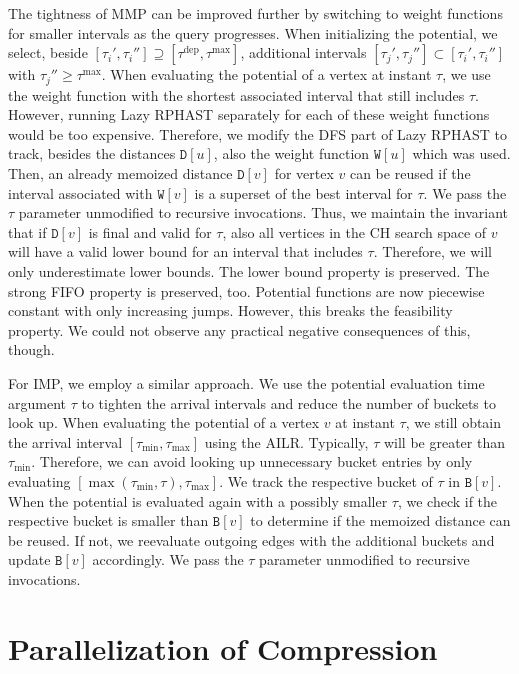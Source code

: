 \documentclass[a4paper,UKenglish,cleveref, autoref, thm-restate,anonymous]{lipics-v2021}
\newcommand*{\tdep}{\tau^{\operatorname{dep}}}
\newcommand*{\tmax}{\tau^{\max}}
\begin{document}
The tightness of MMP can be improved further by switching to weight functions for smaller intervals as the query progresses.
When initializing the potential, we select, beside $[\tau_i', \tau_i''] \supseteq [\tdep,\tmax]$, additional intervals $[\tau_j', \tau_j''] \subset [\tau_i', \tau_i'']$ with $\tau_j'' \geq \tmax$.
When evaluating the potential of a vertex at instant $\tau$, we use the weight function with the shortest associated interval that still includes $\tau$.
However, running Lazy RPHAST separately for each of these weight functions would be too expensive.
Therefore, we modify the DFS part of Lazy RPHAST to track, besides the distances $\mathtt{D}[u]$, also the weight function $\mathtt{W}[u]$ which was used.
Then, an already memoized distance $\mathtt{D}[v]$ for vertex $v$ can be reused if the interval associated with $\mathtt{W}[v]$ is a superset of the best interval for $\tau$.
We pass the $\tau$ parameter unmodified to recursive invocations.
Thus, we maintain the invariant that if $\mathtt{D}[v]$ is final and valid for $\tau$, also all vertices in the CH search space of $v$ will have a valid lower bound for an interval that includes $\tau$.
Therefore, we will only underestimate lower bounds.
The lower bound property is preserved.
The strong FIFO property is preserved, too.
Potential functions are now piecewise constant with only increasing jumps.
However, this breaks the feasibility property.
We could not observe any practical negative consequences of this, though.

For IMP, we employ a similar approach.
We use the potential evaluation time argument $\tau$ to tighten the arrival intervals and reduce the number of buckets to look up.
When evaluating the potential of a vertex $v$ at instant $\tau$, we still obtain the arrival interval $[\tau_{\min}, \tau_{\max}]$ using the AILR.
Typically, $\tau$ will be greater than $\tau_{\min}$.
Therefore, we can avoid looking up unnecessary bucket entries by only evaluating $[\max(\tau_{\min}, \tau), \tau_{\max}]$.
We track the respective bucket of $\tau$ in $\mathtt{B}[v]$.
When the potential is evaluated again with a possibly smaller $\tau$, we check if the respective bucket is smaller than $\mathtt{B}[v]$ to determine if the memoized distance can be reused.
If not, we reevaluate outgoing edges with the additional buckets and update $\mathtt{B}[v]$ accordingly.
We pass the $\tau$ parameter unmodified to recursive invocations.

\section{Parallelization of Compression}\label{sec:appendix:parallelization}
\end{document}
